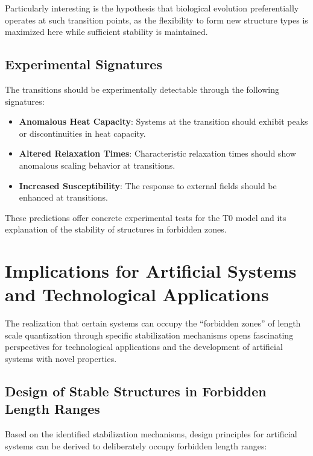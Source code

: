 \documentclass[12pt,a4paper]{article}
\begin{document}
	Particularly interesting is the hypothesis that biological evolution preferentially operates at such transition points, as the flexibility to form new structure types is maximized here while sufficient stability is maintained.
	
	\subsection{Experimental Signatures}
	
	The transitions should be experimentally detectable through the following signatures:
	
	\begin{itemize}
		\item \textbf{Anomalous Heat Capacity}: Systems at the transition should exhibit peaks or discontinuities in heat capacity.
		
		\item \textbf{Altered Relaxation Times}: Characteristic relaxation times should show anomalous scaling behavior at transitions.
		
		\item \textbf{Increased Susceptibility}: The response to external fields should be enhanced at transitions.
	\end{itemize}
	
	These predictions offer concrete experimental tests for the T0 model and its explanation of the stability of structures in forbidden zones.
	
	\section{Implications for Artificial Systems and Technological Applications}
	
	The realization that certain systems can occupy the ``forbidden zones'' of length scale quantization through specific stabilization mechanisms opens fascinating perspectives for technological applications and the development of artificial systems with novel properties.
	
	\subsection{Design of Stable Structures in Forbidden Length Ranges}
	
	Based on the identified stabilization mechanisms, design principles for artificial systems can be derived to deliberately occupy forbidden length ranges:
	
\end{document}
